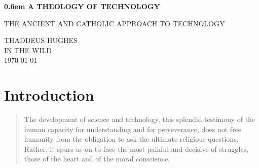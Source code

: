 \documentclass[letterpaper]{article}
\begin{document}
\clearpage
\newcommand\nbvspace[1][3]{\vspace*{\stretch{#1}}}

\newcommand{\nbstretchyspace}{\spaceskip0.5em plus 0.25em minus 0.25em}

\newcommand{\nbtitlestretch}{\spaceskip0.6em}
\thispagestyle{empty}
\pagestyle{plain}
\begin{center}
  \bfseries
  \nbvspace[1]
  \Huge
  {\nbtitlestretch\huge
    A THEOLOGY OF TECHNOLOGY}

  \nbvspace[1]
  \normalsize
  THE ANCIENT AND CATHOLIC APPROACH TO TECHNOLOGY\\

  \nbvspace[1]
  \nbvspace[2]

  \nbvspace[3]
  \normalsize

  \Large THADDEUS HUGHES\\


  \large
  IN THE WILD \\
  \small \MakeUppercase{\today} \\
\end{center}

\raggedbottom

\clearpage
\setcounter{page}{1}

\tableofcontents

\newpage



\section{Introduction}

\begin{quote}
  The development of science and technology, this splendid testimony of the human capacity for understanding and for perseverance, does not free humanity from the obligation to ask the ultimate religious questions. Rather, it spurs us on to face the most painful and decisive of struggles, those of the heart and of the moral conscience.
\end{quote}
\end{document}
